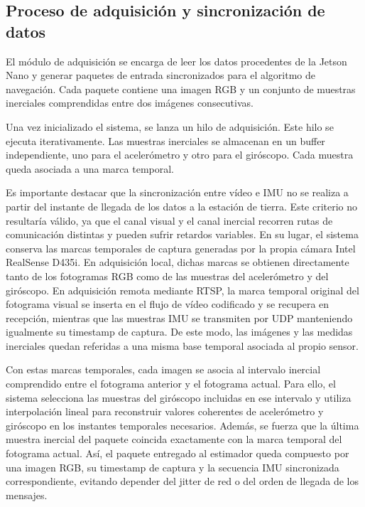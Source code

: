 \subsection{Proceso de adquisición y sincronización de datos}

El módulo de adquisición se encarga de leer los datos procedentes de la Jetson Nano y generar paquetes de entrada 
sincronizados para el algoritmo de navegación. Cada paquete contiene una imagen RGB y un conjunto de muestras inerciales comprendidas 
entre dos imágenes consecutivas.


Una vez inicializado el sistema, se lanza un hilo de adquisición. Este hilo se ejecuta iterativamente. Las muestras 
inerciales se almacenan en un buffer independiente, uno para el acelerómetro y otro para el giróscopo. Cada muestra queda asociada a una 
marca temporal.

Es importante destacar que la sincronización entre vídeo e IMU no se realiza a partir del instante de llegada de los datos a la estación de tierra. Este criterio no resultaría válido, ya que el canal visual y el canal inercial recorren rutas de comunicación distintas y pueden sufrir retardos variables. En su lugar, el sistema conserva las marcas temporales de captura generadas por la propia cámara Intel RealSense D435i. En adquisición local, dichas marcas se obtienen directamente tanto de los fotogramas RGB como de las muestras del acelerómetro y del giróscopo. En adquisición remota mediante RTSP, la marca temporal original del fotograma visual se inserta en el flujo de vídeo codificado y se recupera en recepción, mientras que las muestras IMU se transmiten por UDP manteniendo igualmente su timestamp de captura. De este modo, las imágenes y las medidas inerciales quedan referidas a una misma base temporal asociada al propio sensor.

Con estas marcas temporales, cada imagen se asocia al intervalo inercial comprendido entre el fotograma anterior y el fotograma actual. Para ello, el sistema selecciona las muestras del giróscopo incluidas en ese intervalo y utiliza interpolación lineal para reconstruir valores coherentes de acelerómetro y giróscopo en los instantes temporales necesarios. Además, se fuerza que la última muestra inercial del paquete coincida exactamente con la marca temporal del fotograma actual. Así, el paquete entregado al estimador queda compuesto por una imagen RGB, su timestamp de captura y la secuencia IMU sincronizada correspondiente, evitando depender del jitter de red o del orden de llegada de los mensajes.

